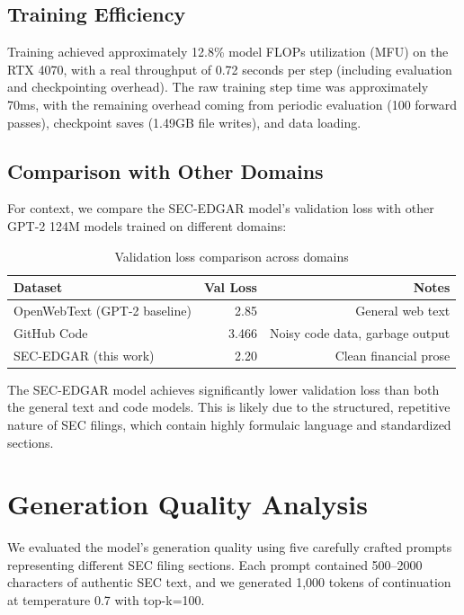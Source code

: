 \documentclass[12pt]{article}
\begin{document}
\subsection{Training Efficiency}

Training achieved approximately 12.8\% model FLOPs utilization (MFU) on the RTX 4070, with a real throughput of 0.72 seconds per step (including evaluation and checkpointing overhead). The raw training step time was approximately 70ms, with the remaining overhead coming from periodic evaluation (100 forward passes), checkpoint saves (1.49GB file writes), and data loading.

\subsection{Comparison with Other Domains}

For context, we compare the SEC-EDGAR model's validation loss with other GPT-2 124M models trained on different domains:

\begin{table}[H]
\centering
\begin{tabular}{lrr}
\toprule
\textbf{Dataset} & \textbf{Val Loss} & \textbf{Notes} \\
\midrule
OpenWebText (GPT-2 baseline) & 2.85 & General web text \\
GitHub Code & 3.466 & Noisy code data, garbage output \\
SEC-EDGAR (this work) & 2.20 & Clean financial prose \\
\bottomrule
\end{tabular}
\caption{Validation loss comparison across domains}
\label{tab:comparison}
\end{table}

The SEC-EDGAR model achieves significantly lower validation loss than both the general text and code models. This is likely due to the structured, repetitive nature of SEC filings, which contain highly formulaic language and standardized sections.

\section{Generation Quality Analysis}

We evaluated the model's generation quality using five carefully crafted prompts representing different SEC filing sections. Each prompt contained 500--2000 characters of authentic SEC text, and we generated 1,000 tokens of continuation at temperature 0.7 with top-k=100.
\end{document}

